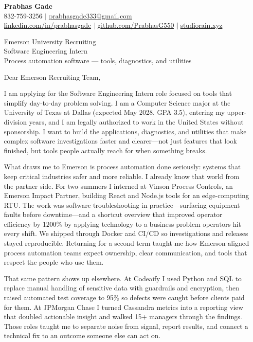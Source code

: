 \documentclass[letterpaper,11pt]{letter}
\begin{document}
\begin{flushleft}
\textbf{\large Prabhas Gade}\\
832-759-3256 $|$ \href{mailto:prabhasgade333@gmail.com}{prabhasgade333@gmail.com}\\
\href{https://linkedin.com/in/prabhasgade}{linkedin.com/in/prabhasgade} $|$
\href{https://github.com/PrabhasG550}{github.com/PrabhasG550} $|$
\href{https://studiorain.xyz}{studiorain.xyz}
\end{flushleft}

\vspace{6pt}
\begin{flushleft}
Emerson University Recruiting\\
Software Engineering Intern\\
Process automation software --- tools, diagnostics, and utilities
\end{flushleft}

Dear Emerson Recruiting Team,

I am applying for the Software Engineering Intern role focused on tools that simplify day-to-day problem solving. I am a Computer Science major at the University of Texas at Dallas (expected May 2028, GPA 3.5), entering my upper-division years, and I am legally authorized to work in the United States without sponsorship. I want to build the applications, diagnostics, and utilities that make complex software investigations faster and clearer---not just features that look finished, but tools people actually reach for when something breaks.

What draws me to Emerson is process automation done seriously: systems that keep critical industries safer and more reliable. I already know that world from the partner side. For two summers I interned at Vinson Process Controls, an Emerson Impact Partner, building React and Node.js tools for an edge-computing RTU. The work was software troubleshooting in practice---surfacing equipment faults before downtime---and a shortcut overview that improved operator efficiency by 1200\% by applying technology to a business problem operators hit every shift. We shipped through Docker and CI/CD so investigations and releases stayed reproducible. Returning for a second term taught me how Emerson-aligned process automation teams expect ownership, clear communication, and tools that respect the people who use them.

That same pattern shows up elsewhere. At Codeaify I used Python and SQL to replace manual handling of sensitive data with guardrails and encryption, then raised automated test coverage to 95\% so defects were caught before clients paid for them. At JPMorgan Chase I turned Cassandra metrics into a reporting view that doubled actionable insight and walked 15+ managers through the findings. Those roles taught me to separate noise from signal, report results, and connect a technical fix to an outcome someone else can act on.
\end{document}
